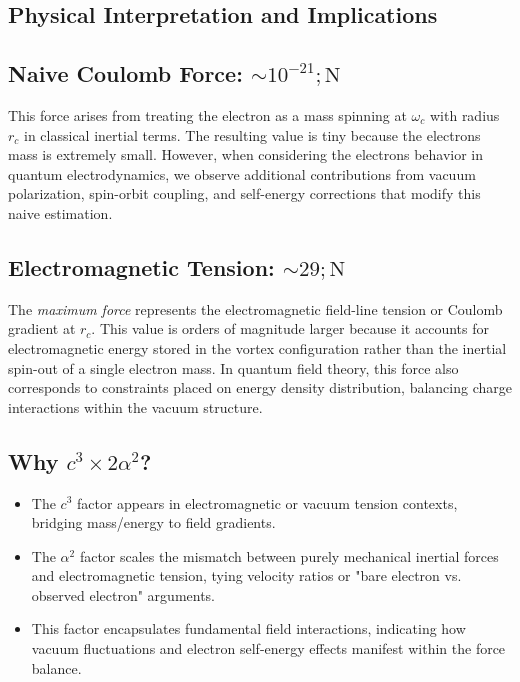 \subsection*{Physical Interpretation and Implications}


\subsection*{Naive Coulomb Force: $\sim 10^{-21} ; \mathrm{N}$}


This force arises from treating the electron as a mass spinning at $\omega_c$ with radius $r_c$ in classical inertial terms. The resulting value is tiny because the electron\rqs s mass is extremely small. However, when considering the electron\rqs s behavior in quantum electrodynamics, we observe additional contributions from vacuum polarization, spin-orbit coupling, and self-energy corrections that modify this naive estimation.


\subsection*{Electromagnetic Tension: $\sim 29 ; \mathrm{N}$}


The \textit{maximum force} represents the electromagnetic field-line tension or Coulomb gradient at $r_c$. This value is orders of magnitude larger because it accounts for electromagnetic energy stored in the vortex configuration rather than the inertial spin-out of a single electron mass. In quantum field theory, this force also corresponds to constraints placed on energy density distribution, balancing charge interactions within the vacuum structure.


\subsection*{Why $c^3 \times 2 \alpha^2$?}


\begin{itemize}
\item The $c^3$ factor appears in electromagnetic or vacuum tension contexts, bridging mass/energy to field gradients.
\item The $\alpha^2$ factor scales the mismatch between purely mechanical inertial forces and electromagnetic tension, tying velocity ratios or "bare electron vs. observed electron" arguments.
\item This factor encapsulates fundamental field interactions, indicating how vacuum fluctuations and electron self-energy effects manifest within the force balance.
\end{itemize}


